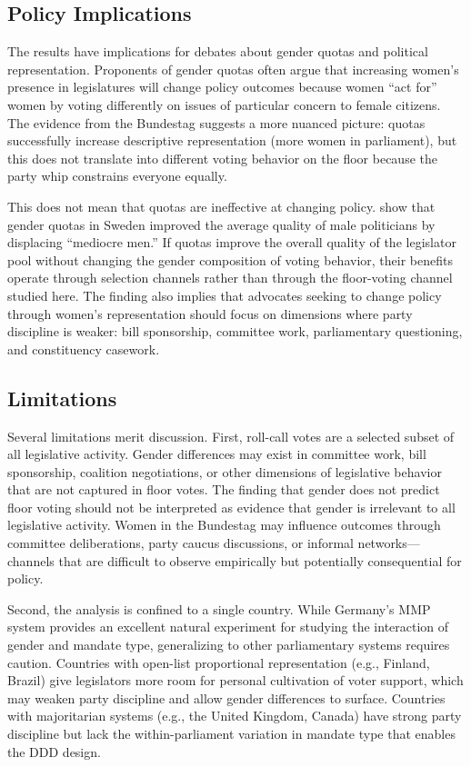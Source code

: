 \documentclass[12pt]{article}
\begin{document}
\subsection{Policy Implications}

The results have implications for debates about gender quotas and political representation. Proponents of gender quotas often argue that increasing women's presence in legislatures will change policy outcomes because women ``act for'' women by voting differently on issues of particular concern to female citizens. The evidence from the Bundestag suggests a more nuanced picture: quotas successfully increase descriptive representation (more women in parliament), but this does not translate into different voting behavior on the floor because the party whip constrains everyone equally.

This does not mean that quotas are ineffective at changing policy. \citet{besley2017} show that gender quotas in Sweden improved the average quality of male politicians by displacing ``mediocre men.'' If quotas improve the overall quality of the legislator pool without changing the gender composition of voting behavior, their benefits operate through selection channels rather than through the floor-voting channel studied here. The finding also implies that advocates seeking to change policy through women's representation should focus on dimensions where party discipline is weaker: bill sponsorship, committee work, parliamentary questioning, and constituency casework.

\subsection{Limitations}

Several limitations merit discussion. First, roll-call votes are a selected subset of all legislative activity. Gender differences may exist in committee work, bill sponsorship, coalition negotiations, or other dimensions of legislative behavior that are not captured in floor votes. The finding that gender does not predict floor voting should not be interpreted as evidence that gender is irrelevant to all legislative activity. Women in the Bundestag may influence outcomes through committee deliberations, party caucus discussions, or informal networks---channels that are difficult to observe empirically but potentially consequential for policy.

Second, the analysis is confined to a single country. While Germany's MMP system provides an excellent natural experiment for studying the interaction of gender and mandate type, generalizing to other parliamentary systems requires caution. Countries with open-list proportional representation (e.g., Finland, Brazil) give legislators more room for personal cultivation of voter support, which may weaken party discipline and allow gender differences to surface. Countries with majoritarian systems (e.g., the United Kingdom, Canada) have strong party discipline but lack the within-parliament variation in mandate type that enables the DDD design.
\end{document}
